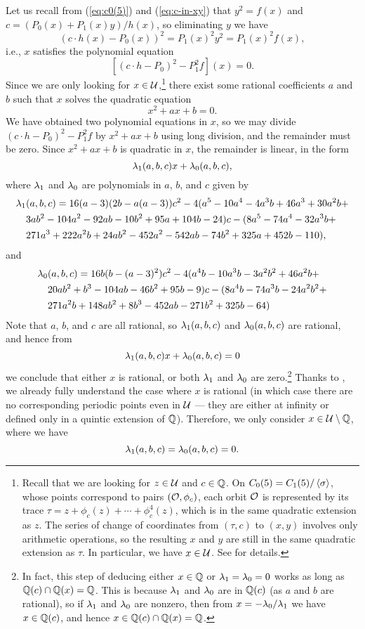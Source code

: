 Let us recall from (\ref{eq:c0(5)}) and (\ref{eq:c-in-xy}) that $y^2 =
f(x)$ and $c = (P_0(x) + P_1(x) y)/h(x)$, so eliminating $y$ we have
\[
(c \cdot h(x) - P_0(x))^2 = P_1(x)^2 y^2 = P_1(x)^2 f(x),
\]
i.e., $x$ satisfies the polynomial equation
\[
[(c \cdot h - P_0)^2 - P_1^2 f](x) = 0.
\]
Since we are only looking for $x \in \mathcal{U}$,\footnote{%
  Recall that we are looking for $z \in \mathcal{U}$ and $c \in \mathbb{Q}$. On $C_0(5)
  = C_1(5) / \left<\sigma\right>$, whose points correspond to pairs $(\mathcal{O},
  \phi_c)$, each orbit $\mathcal{O}$ is represented by its trace $\tau = z +
  \phi_c(z) + \cdots + \phi_c^4(z)$, which is in the same quadratic
  extension as $z$. The series of change of coordinates from $(\tau,
  c)$ to $(x, y)$ involves only arithmetic operations, so the
  resulting $x$ and $y$ are still in the same quadratic extension as
  $\tau$. In particular, we have $x \in \mathcal{U}$. See \cite{MR1480542} for
  details.}
there exist some rational coefficients $a$ and $b$ such that $x$
solves the quadratic equation
\[
x^2 + a x + b = 0.
\]
We have obtained two polynomial equations in $x$, so we may divide $(c
\cdot h - P_0)^2 - P_1^2 f$ by $x^2 + ax + b$ using long division, and
the remainder must be zero. Since $x^2 + ax + b$ is quadratic in $x$,
the remainder is linear, in the form
\[
\lambda_1(a, b, c) x + \lambda_0(a, b, c),
\]
where $\lambda_1$ and $\lambda_0$ are polynomials in $a$, $b$, and $c$ given by
\[
\begin{aligned}
  \lambda_1&(a, b, c) = 16 (a - 3) (2b - a(a-3)) c^2 -
  4(a^{5} - 10 a^{4} - 4 a^{3} b + 46 a^{3} + 30 a^{2} b + \\
  & 3 a b^{2} - 104 a^{2} - 92 a b - 10 b^{2} + 95 a + 104 b - 24) c -
  (8 a^{5} - 74 a^{4} - 32 a^{3} b + \\
  & 271 a^{3} + 222 a^{2} b + 24 a b^{2} - 452 a^{2} - 542 a b - 74
  b^{2} + 325 a + 452 b - 110),
\end{aligned}
\]
and
\[
\begin{aligned}
  \lambda_0&(a, b, c) = 16 b (b - (a-3)^2) c^2 -
  4(a^{4} b - 10 a^{3} b - 3 a^{2} b^{2} + 46 a^{2} b + \\
  & 20 a b^{2} + b^{3} - 104 a b - 46 b^{2} + 95 b - 9) c -
  (8 a^{4} b - 74 a^{3} b - 24 a^{2} b^{2} + \\
  & 271 a^{2} b + 148 a b^{2} + 8 b^{3} - 452 a b - 271 b^{2} + 325 b
  - 64)
\end{aligned}
\]
Note that $a$, $b$, and $c$ are all rational, so $\lambda_1(a, b, c)$ and
$\lambda_0(a, b, c)$ are rational, and hence from
\[
\lambda_1(a, b, c) x + \lambda_0(a, b, c) = 0
\]
we conclude that either $x$ is rational, or both $\lambda_1$ and $\lambda_0$ are
zero.\footnote{%
  In fact, this step of deducing either $x \in \mathbb{Q}$ or $\lambda_1 = \lambda_0 =
  0$ works as long as $\mathbb{Q}(c) \cap \mathbb{Q}(x) = \mathbb{Q}$. This is because $\lambda_1$
  and $\lambda_0$ are in $\mathbb{Q}(c)$ (as $a$ and $b$ are rational), so if
  $\lambda_1$ and $\lambda_0$ are nonzero, then from $x = -\lambda_0/\lambda_1$ we have $x
  \in \mathbb{Q}(c)$, and hence $x \in \mathbb{Q}(c) \cap \mathbb{Q}(x) = \mathbb{Q}$.}
Thanks to \cite{MR1480542}, we already fully understand the case
where $x$ is rational (in which case there are no corresponding
periodic points even in $\mathcal{U}$ --- they are either at infinity or
defined only in a quintic extension of $\mathbb{Q}$). Therefore, we only
consider $x \in \mathcal{U} \setminus \mathbb{Q}$, where we have
\[
\lambda_1(a, b, c) = \lambda_0(a, b, c) = 0.
\]

